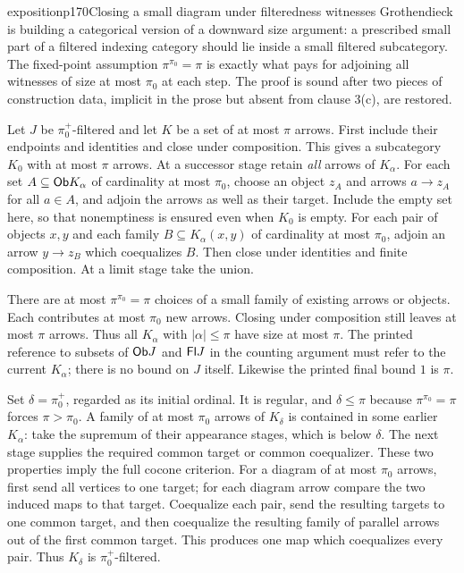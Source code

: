 \begin{dcomment}{exposition}{p170}{Closing a small diagram under filteredness witnesses}
Grothendieck is building a categorical version of a downward size argument: a prescribed small part of a filtered indexing category should lie inside a small filtered subcategory. The fixed-point assumption $\pi^{\pi_0}=\pi$ is exactly what pays for adjoining all witnesses of size at most $\pi_0$ at each step. The proof is sound after two pieces of construction data, implicit in the prose but absent from clause 3(c), are restored.

Let $J$ be $\pi_0^+$-filtered and let $K$ be a set of at most $\pi$ arrows. First include their endpoints and identities and close under composition. This gives a subcategory $K_0$ with at most $\pi$ arrows. At a successor stage retain \emph{all} arrows of $K_\alpha$. For each set $A\subseteq\mathsf{Ob} K_\alpha$ of cardinality at most $\pi_0$, choose an object $z_A$ and arrows $a\to z_A$ for all $a\in A$, and adjoin the arrows as well as their target. Include the empty set here, so that nonemptiness is ensured even when $K_0$ is empty. For each pair of objects $x,y$ and each family $B\subseteq K_\alpha(x,y)$ of cardinality at most $\pi_0$, adjoin an arrow $y\to z_B$ which coequalizes $B$. Then close under identities and finite composition. At a limit stage take the union.

There are at most $\pi^{\pi_0}=\pi$ choices of a small family of existing arrows or objects. Each contributes at most $\pi_0$ new arrows. Closing under composition still leaves at most $\pi$ arrows. Thus all $K_\alpha$ with $|\alpha|\leq\pi$ have size at most $\pi$. The printed reference to subsets of $\mathsf{Ob} J$ and $\mathsf{Fl} J$ in the counting argument must refer to the current $K_\alpha$; there is no bound on $J$ itself. Likewise the printed final bound $1$ is $\pi$.

Set $\delta=\pi_0^+$, regarded as its initial ordinal. It is regular, and $\delta\leq\pi$ because $\pi^{\pi_0}=\pi$ forces $\pi>\pi_0$. A family of at most $\pi_0$ arrows of $K_\delta$ is contained in some earlier $K_\alpha$: take the supremum of their appearance stages, which is below $\delta$. The next stage supplies the required common target or common coequalizer. These two properties imply the full cocone criterion. For a diagram of at most $\pi_0$ arrows, first send all vertices to one target; for each diagram arrow compare the two induced maps to that target. Coequalize each pair, send the resulting targets to one common target, and then coequalize the resulting family of parallel arrows out of the first common target. This produces one map which coequalizes every pair. Thus $K_\delta$ is $\pi_0^+$-filtered.


\end{dcomment}
